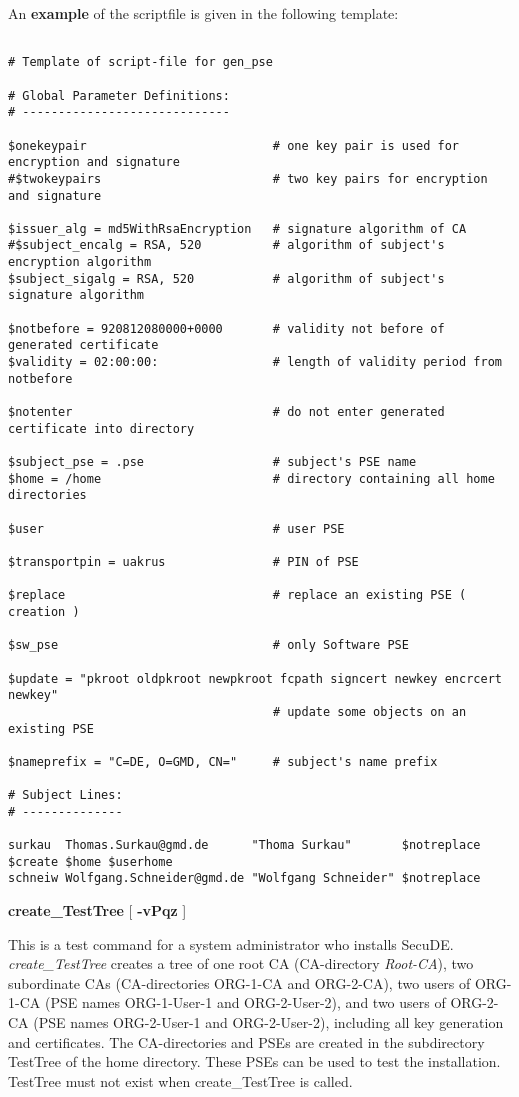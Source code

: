 An {\bf example} of the scriptfile is given in the following template:
{\small
\begin{verbatim}

# Template of script-file for gen_pse

# Global Parameter Definitions:
# -----------------------------

$onekeypair                          # one key pair is used for encryption and signature
#$twokeypairs                        # two key pairs for encryption and signature

$issuer_alg = md5WithRsaEncryption   # signature algorithm of CA
#$subject_encalg = RSA, 520          # algorithm of subject's encryption algorithm
$subject_sigalg = RSA, 520           # algorithm of subject's signature algorithm

$notbefore = 920812080000+0000       # validity not before of generated certificate
$validity = 02:00:00:                # length of validity period from notbefore

$notenter                            # do not enter generated certificate into directory

$subject_pse = .pse                  # subject's PSE name
$home = /home                        # directory containing all home directories

$user                                # user PSE

$transportpin = uakrus               # PIN of PSE

$replace                             # replace an existing PSE ( creation )

$sw_pse                              # only Software PSE

$update = "pkroot oldpkroot newpkroot fcpath signcert newkey encrcert newkey"
                                     # update some objects on an existing PSE

$nameprefix = "C=DE, O=GMD, CN="     # subject's name prefix

# Subject Lines:
# --------------

surkau  Thomas.Surkau@gmd.de      "Thoma Surkau"       $notreplace $create $home $userhome
schneiw Wolfgang.Schneider@gmd.de "Wolfgang Schneider" $notreplace
\end{verbatim}
}
\vspace{1em}
{\bf create\_TestTree} [ {\bf -vPqz} ] 

This is a test command for a system administrator who installs SecuDE. {\em create\_TestTree}
creates a tree of one root CA (CA-directory {\em Root-CA}), two subordinate CAs (CA-directories
ORG-1-CA and ORG-2-CA), two users of ORG-1-CA (PSE names ORG-1-User-1 and ORG-2-User-2),
and two users of ORG-2-CA (PSE names ORG-2-User-1 and ORG-2-User-2), including all key generation
and certificates. The CA-directories and PSEs are created in the subdirectory TestTree of the 
home directory. 
These PSEs can be used to test the installation. TestTree must not exist when
create\_TestTree is called.

